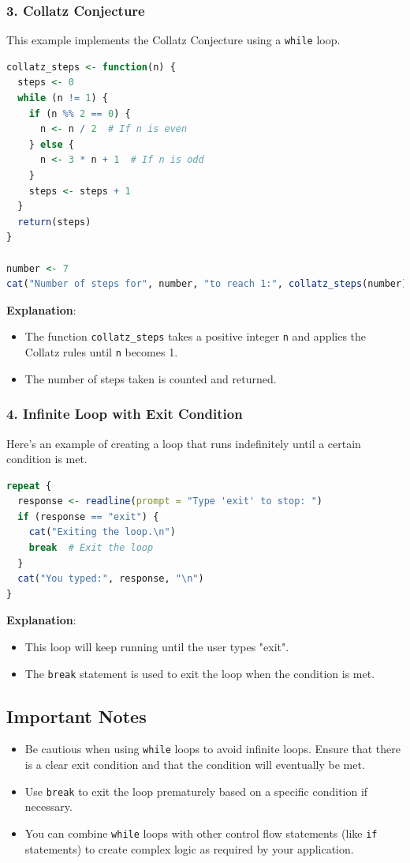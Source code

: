 \documentclass[10pt]{book}
\begin{document}
\subsubsection{3. Collatz Conjecture}

This example implements the Collatz Conjecture using a \texttt{while} loop.

\begin{lstlisting}[language=R]
collatz_steps <- function(n) {
  steps <- 0
  while (n != 1) {
    if (n %% 2 == 0) {
      n <- n / 2  # If n is even
    } else {
      n <- 3 * n + 1  # If n is odd
    }
    steps <- steps + 1
  }
  return(steps)
}

number <- 7
cat("Number of steps for", number, "to reach 1:", collatz_steps(number), "\n")
\end{lstlisting}

\textbf{Explanation}:
\begin{itemize}
    \item The function \texttt{collatz\_steps} takes a positive integer \texttt{n} and applies the Collatz rules until \texttt{n} becomes 1.
    \item The number of steps taken is counted and returned.
\end{itemize}

\subsubsection{4. Infinite Loop with Exit Condition}

Here’s an example of creating a loop that runs indefinitely until a certain condition is met.

\begin{lstlisting}[language=R]
repeat {
  response <- readline(prompt = "Type 'exit' to stop: ")
  if (response == "exit") {
    cat("Exiting the loop.\n")
    break  # Exit the loop
  }
  cat("You typed:", response, "\n")
}
\end{lstlisting}

\textbf{Explanation}:
\begin{itemize}
    \item This loop will keep running until the user types "exit".
    \item The \texttt{break} statement is used to exit the loop when the condition is met.
\end{itemize}

\subsection{Important Notes}
\begin{itemize}
    \item Be cautious when using \texttt{while} loops to avoid infinite loops. Ensure that there is a clear exit condition and that the condition will eventually be met.
    \item Use \texttt{break} to exit the loop prematurely based on a specific condition if necessary.
    \item You can combine \texttt{while} loops with other control flow statements (like \texttt{if} statements) to create complex logic as required by your application.
\end{itemize}
\end{document}
